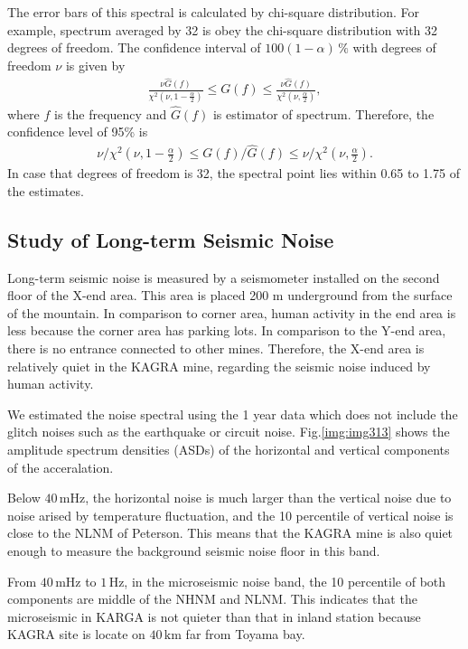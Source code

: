 The error bars of this spectral is calculated by chi-square distribution. For example, spectrum averaged by 32 is obey the chi-square distribution with 32 degrees of freedom. The confidence interval of $100(1-\alpha)\,\%$ with degrees of freedom $\nu$ is given by 
\begin{eqnarray}
  \frac{\nu{\hat{G}(f)}}{\chi^2(\nu,1-\frac{\alpha}{2})} \leq G(f) \leq \frac{\nu{\hat{G}(f)}}{\chi^2(\nu,\frac{\alpha}{2})},
\end{eqnarray}
where $f$ is the frequency and $\hat{G}(f)$ is estimator of spectrum. Therefore, the confidence level of 95\% is 
\begin{eqnarray}
  \nu/\chi^2(\nu,1-\frac{\alpha}{2}) \leq G(f)/\hat{G}(f) \leq \nu/\chi^2(\nu,\frac{\alpha}{2}).
\end{eqnarray}
In case that degrees of freedom is 32, the spectral point lies within 0.65 to 1.75 of the estimates.

\subsection{Study of Long-term Seismic Noise}
Long-term seismic noise is measured by a seismometer installed on the second floor of the X-end area. This area is placed 200 $\mathrm{m}$ underground from the surface of the mountain. In comparison to corner area, human activity in the end area is less because the corner area has parking lots. In comparison to the Y-end area, there is no entrance connected to other mines. Therefore, the X-end area is relatively quiet in the KAGRA mine, regarding the seismic noise induced by human activity. 

We estimated the noise spectral using the 1 year data which does not include the glitch noises such as the earthquake or circuit noise. Fig.\ref{img:img313} shows the amplitude spectrum densities (ASDs) of the horizontal and vertical components of the acceralation.

Below $40\,\mathrm{mHz}$, the horizontal noise is much larger than the vertical noise due to noise arised by temperature fluctuation, and the 10 percentile of vertical noise is close to the NLNM of Peterson. This means that the KAGRA mine is also quiet enough to measure the background seismic noise floor in this band.

From $40\,\mathrm{mHz}$ to $1\,\mathrm{Hz}$, in the microseismic noise band, the 10 percentile of both components are middle of the NHNM and NLNM. This indicates that the microseismic in KARGA is not quieter than that in inland station because KAGRA site is locate on $40\,\mathrm{km}$ far from Toyama bay. 

